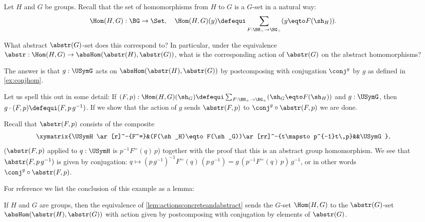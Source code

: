 \begin{example}
  \label{ex:abstrandconj}
  Let $H$ and $G$ be groups.  Recall that the set of homomorphisms from $H$ to $G$ is a $G$-set in a natural way:
$$\Hom(H,G):\BG\to\Set,\quad \Hom(H,G)(y)\defequi \sum_{F:\BH_\div\to \BG_\div}(y\eqto F(\sh_H)).$$

What abstract $\abstr(G)$-set does this correspond to?
In particular, under the equivalence $\abstr:\Hom(H,G)\to\absHom(\abstr(H),\abstr(G))$, what is the corresponding action of $\abstr(G)$ on the abstract homomorphisms?

The answer is that $g:\USymG$ acts on $\absHom(\abstr(H),\abstr(G))$ by postcomposing with conjugation $\conj^g$ by $g$ as defined in \cref{ex:conjhom}.

Let us spell this out in some detail:
If $(F,p):\Hom(H,G)(\sh_G)\defequi
 \sum_{F:\BH_\div\to \BG_\div}(\sh_G\eqto F(\sh_H))$ and $g:\USymG$, then $g\cdot(F,p)\defequi(F,p\,g^{-1})$.  If we show that the action of $g$ sends $\abstr(F,p)$ to $\conj^g\circ\abstr(F,p)$ we are done.

Recall that $\abstr(F,p)$ consists of the composite
$$\xymatrix{\USymH\ar[r]^-{F^=}&(F(\sh_H)\eqto F(\sh_G))\ar[rr]^-{t\mapsto p^{-1}t\,p}&&\USymG},$$
(\ie $\abstr(F,p)$ applied to $q:\USymH $ is  $p^{-1}F^=(q)\,p$)  together with the proof that this is an abstract group homomorphism.
We see that $\abstr(F,p\,g^{-1})$ is given by conjugation:
$q\mapsto(p\,g^{-1})^{-1}F^=(q)\,(p\,g^{-1})=g\,(p^{-1}F^=(q)\,p)\,g^{-1}$, or in other words $\conj^g\circ\abstr(F,p)$.
\end{example}
For reference we list the conclusion of this example as a lemma:
\begin{lemma}\label{lem:abstrandconj}
  If $H$ and $G$ are groups, then the equivalence of \cref{lem:actionsconcreteandabstract} sends the $G$-set $\Hom(H,G)$ to the $\abstr(G)$-set $\absHom(\abstr(H),\abstr(G))$ with action given by postcomposing with conjugation by elements of $\abstr(G)$.
\end{lemma}

